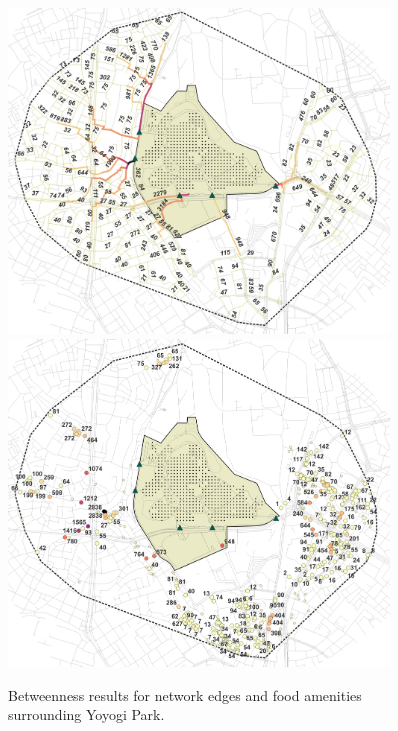 \begin{figure}[H]
  \centering
  \captionsetup{width=0.9\textwidth}
  \includegraphics[width=0.9\textwidth]{images/network/yoyogi_betweenness_roads.png} \\
  \vspace{10pt} %
  \includegraphics[width=0.9\textwidth]{images/network/yoyogi_betweenness_food.png} \\
  \vspace{10pt}
  \caption[Yoyogi Park - betweenness]{Betweenness results for network edges and food amenities surrounding Yoyogi Park.}
  \label{fig:yoyogi_betweenness}
\end{figure}

